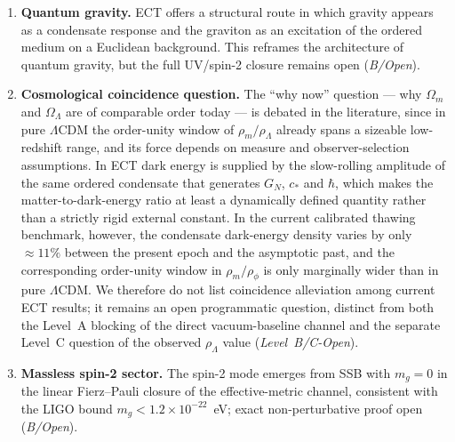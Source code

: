 \documentclass[11pt,a4paper]{article}
\begin{document}
\begin{enumerate}
\emph{Vacuum decay as Euclidean weighting.} In ordinary language, false-vacuum decay sounds like a field sitting in one state and then tunnelling to another state in time. ECT reads this more carefully. The primitive object is a four-dimensional Euclidean condensate configuration, not a field evolving in an external clock time. The Coleman bounce remains the correct semiclassical tool when its assumptions apply, but in ECT it is interpreted as a Euclidean saddle controlling a relative weight or effective transition amplitude between admissible configurations. In the Lorentzian branch this may be reconstructed as a decay rate; at the deeper ECT level it is a statement about Euclidean configuration weighting. For the minimal primary condensate potential, the false-vacuum structure required by Coleman decay is absent.

\item \textbf{Quantum gravity.} ECT offers a structural route in which gravity appears as a condensate response and the graviton as an excitation of the ordered medium on a Euclidean background. This reframes the architecture of quantum gravity, but the full UV/spin-2 closure remains open (\emph{B/Open}).

\item \textbf{Cosmological coincidence question.} The ``why now'' question --- why $\Omega_m$ and $\Omega_\Lambda$ are of comparable order today --- is debated in the literature, since in pure $\Lambda$CDM the order-unity window of $\rho_m/\rho_\Lambda$ already spans a sizeable low-redshift range, and its force depends on measure and observer-selection assumptions. In ECT dark energy is supplied by the slow-rolling amplitude of the same ordered condensate that generates $G_N$, $c_*$ and $\hbar$, which makes the matter-to-dark-energy ratio at least a dynamically defined quantity rather than a strictly rigid external constant. In the current calibrated thawing benchmark, however, the condensate dark-energy density varies by only ${\approx}11\%$ between the present epoch and the asymptotic past, and the corresponding order-unity window in $\rho_m/\rho_\phi$ is only marginally wider than in pure $\Lambda$CDM. We therefore do not list coincidence alleviation among current ECT results; it remains an open programmatic question, distinct from both the Level~A blocking of the direct vacuum-baseline channel and the separate Level~C question of the observed $\rho_\Lambda$ value (\emph{Level~B/C-Open}).

\item \textbf{Massless spin-2 sector.} The spin-2 mode emerges from SSB with $m_g=0$ in the linear Fierz--Pauli closure of the effective-metric channel, consistent with the LIGO bound $m_g<1.2\times10^{-22}$~eV; exact non-perturbative proof open (\emph{B/Open}).



\end{enumerate}
\end{document}
